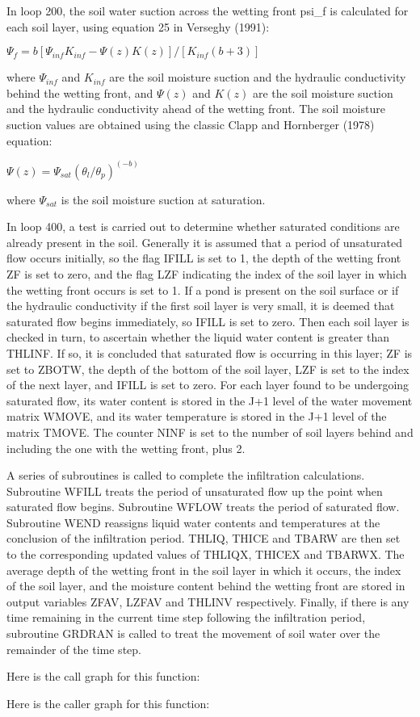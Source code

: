 In loop 200, the soil water suction across the wetting front psi\+\_\+f is calculated for each soil layer, using equation 25 in Verseghy (1991)\+:

$\Psi_f = b[\Psi_{inf} K_{inf} - \Psi(z) K(z)]/[K_{inf} (b+3)]$

where $\Psi_{inf}$ and $K_{inf}$ are the soil moisture suction and the hydraulic conductivity behind the wetting front, and $\Psi(z)$ and $K(z)$ are the soil moisture suction and the hydraulic conductivity ahead of the wetting front. The soil moisture suction values are obtained using the classic Clapp and Hornberger (1978) equation\+:

$\Psi(z) = \Psi_{sat} (\theta_l / \theta_p )^{(-b)}$

where $\Psi_{sat}$ is the soil moisture suction at saturation.

In loop 400, a test is carried out to determine whether saturated conditions are already present in the soil. Generally it is assumed that a period of unsaturated flow occurs initially, so the flag I\+F\+I\+L\+L is set to 1, the depth of the wetting front Z\+F is set to zero, and the flag L\+Z\+F indicating the index of the soil layer in which the wetting front occurs is set to 1. If a pond is present on the soil surface or if the hydraulic conductivity if the first soil layer is very small, it is deemed that saturated flow begins immediately, so I\+F\+I\+L\+L is set to zero. Then each soil layer is checked in turn, to ascertain whether the liquid water content is greater than T\+H\+L\+I\+N\+F. If so, it is concluded that saturated flow is occurring in this layer; Z\+F is set to Z\+B\+O\+T\+W, the depth of the bottom of the soil layer, L\+Z\+F is set to the index of the next layer, and I\+F\+I\+L\+L is set to zero. For each layer found to be undergoing saturated flow, its water content is stored in the J+1 level of the water movement matrix W\+M\+O\+V\+E, and its water temperature is stored in the J+1 level of the matrix T\+M\+O\+V\+E. The counter N\+I\+N\+F is set to the number of soil layers behind and including the one with the wetting front, plus 2.

A series of subroutines is called to complete the infiltration calculations. Subroutine W\+F\+I\+L\+L treats the period of unsaturated flow up the point when saturated flow begins. Subroutine W\+F\+L\+O\+W treats the period of saturated flow. Subroutine W\+E\+N\+D reassigns liquid water contents and temperatures at the conclusion of the infiltration period. T\+H\+L\+I\+Q, T\+H\+I\+C\+E and T\+B\+A\+R\+W are then set to the corresponding updated values of T\+H\+L\+I\+Q\+X, T\+H\+I\+C\+E\+X and T\+B\+A\+R\+W\+X. The average depth of the wetting front in the soil layer in which it occurs, the index of the soil layer, and the moisture content behind the wetting front are stored in output variables Z\+F\+A\+V, L\+Z\+F\+A\+V and T\+H\+L\+I\+N\+V respectively. Finally, if there is any time remaining in the current time step following the infiltration period, subroutine G\+R\+D\+R\+A\+N is called to treat the movement of soil water over the remainder of the time step.

Here is the call graph for this function\+:




Here is the caller graph for this function\+:


